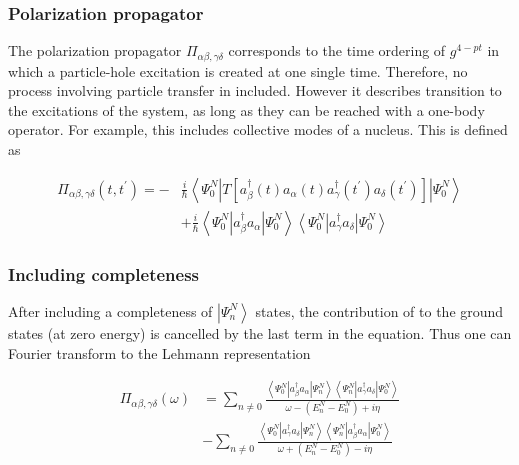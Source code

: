 \documentclass[compress]{beamer}
\begin{document}
\frame
{
\frametitle{Polarization propagator}
\begin{small}
{\scriptsize
The polarization propagator $\Pi_{\alpha \beta, \gamma \delta}$
corresponds to the time ordering of $g^{4-p t}$ in which a
particle-hole excitation is created at one single time. Therefore, no
process involving particle transfer in included. However it describes
transition to the excitations of the system, as long as they can be
reached with a one-body operator. For example, this includes
collective modes of a nucleus. This is defined as

$$
\begin{aligned}
\Pi_{\alpha \beta, \gamma \delta}\left(t, t^{\prime}\right)=- & \frac{i}{\hbar}\left\langle\Psi_{0}^{N}\left|T\left[a_{\beta}^{\dagger}(t) a_{\alpha}(t) a_{\gamma}^{\dagger}\left(t^{\prime}\right) a_{\delta}\left(t^{\prime}\right)\right]\right| \Psi_{0}^{N}\right\rangle \\
& +\frac{i}{\hbar}\left\langle\Psi_{0}^{N}\left|a_{\beta}^{\dagger} a_{\alpha}\right| \Psi_{0}^{N}\right\rangle\left\langle\Psi_{0}^{N}\left|a_{\gamma}^{\dagger} a_{\delta}\right| \Psi_{0}^{N}\right\rangle
\end{aligned}
$$

}
\end{small}
}
\frame
{
\frametitle{Including completeness}
\begin{small}
{\scriptsize

  After including a completeness of $\left|\Psi_{n}^{N}\right\rangle$
states, the contribution of to the ground states (at zero
energy) is cancelled by the last term in the equation. Thus one can
Fourier transform to the Lehmann representation

$$
\begin{aligned}
\Pi_{\alpha \beta, \gamma \delta}(\omega) & =\sum_{n \neq 0} \frac{\left\langle\Psi_{0}^{N}\left|a_{\beta}^{\dagger} a_{\alpha}\right| \Psi_{n}^{N}\right\rangle\left\langle\Psi_{n}^{N}\left|a_{\gamma}^{\dagger} a_{\delta}\right| \Psi_{0}^{N}\right\rangle}{\omega-\left(E_{n}^{N}-E_{0}^{N}\right)+i \eta} \\
& -\sum_{n \neq 0} \frac{\left\langle\Psi_{0}^{N}\left|a_{\gamma}^{\dagger} a_{\delta}\right| \Psi_{n}^{N}\right\rangle\left\langle\Psi_{n}^{N}\left|a_{\beta}^{\dagger} a_{\alpha}\right| \Psi_{0}^{N}\right\rangle}{\omega+\left(E_{n}^{N}-E_{0}^{N}\right)-i \eta}
\end{aligned}
$$

}
\end{small}
}
\frame
\end{document}
